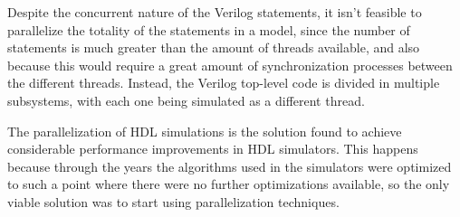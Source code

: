 Despite the concurrent nature of the Verilog statements, it isn't feasible to
parallelize the totality of the statements in a model, since the number of
statements is much greater than the amount of threads available, and also
because this would require a great amount of synchronization processes between
the different threads. Instead, the Verilog top-level code is divided in
multiple subsystems, with each one being simulated as a different thread.

The parallelization of HDL simulations is the solution found to achieve
considerable performance improvements in HDL simulators. This happens because
through the years the algorithms used in the simulators were optimized to such a
point where there were no further optimizations available, so the only viable
solution was to start using parallelization techniques.

